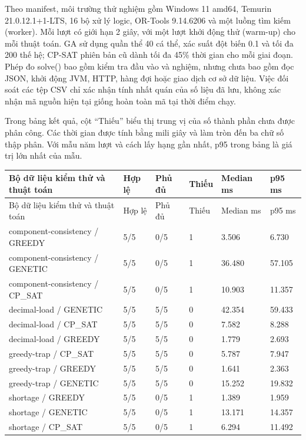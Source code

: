 \documentclass[12pt,a4paper]{report}
\begin{document}
Theo manifest, môi trường thử nghiệm gồm Windows 11 amd64, Temurin 21.0.12.1+1-LTS, 16 bộ xử lý logic, OR-Tools 9.14.6206 và một luồng tìm kiếm (worker). Mỗi lượt có giới hạn 2 giây, với một lượt khởi động thử (warm-up) cho mỗi thuật toán. GA sử dụng quần thể 40 cá thể, xác suất đột biến 0.1 và tối đa 200 thế hệ; CP-SAT phiên bản cũ dành tối đa 45\% thời gian cho mỗi giai đoạn. Phép đo solve() bao gồm kiểm tra đầu vào và nghiệm, nhưng chưa bao gồm đọc JSON, khởi động JVM, HTTP, hàng đợi hoặc giao dịch cơ sở dữ liệu. Việc đối soát các tệp CSV chỉ xác nhận tính nhất quán của số liệu đã lưu, không xác nhận mã nguồn hiện tại giống hoàn toàn mã tại thời điểm chạy.

Trong bảng kết quả, cột ``Thiếu'' biểu thị trung vị của số thành phần chưa được phân công. Các thời gian được tính bằng mili giây và làm tròn đến ba chữ số thập phân. Với mẫu năm lượt và cách lấy hạng gần nhất, p95 trong bảng là giá trị lớn nhất của mẫu.
\begin{longtable}{|p{3.2cm}|p{1.7cm}|p{1.4cm}|p{1.4cm}|p{1.7cm}|p{1.7cm}|}\hline
Bộ dữ liệu kiểm thử và thuật toán & Hợp lệ & Phủ đủ & Thiếu & Median ms & p95 ms \\\hline\endfirsthead
\hline Bộ dữ liệu kiểm thử và thuật toán & Hợp lệ & Phủ đủ & Thiếu & Median ms & p95 ms \\\hline\endhead
component-consistency / GREEDY & 5/5 & 0/5 & 1 & 3.506 & 6.730 \\\hline
component-consistency / GENETIC & 5/5 & 0/5 & 1 & 36.480 & 57.105 \\\hline
component-consistency / CP\_SAT & 5/5 & 0/5 & 1 & 10.903 & 11.357 \\\hline
decimal-load / GENETIC & 5/5 & 5/5 & 0 & 42.354 & 59.433 \\\hline
decimal-load / CP\_SAT & 5/5 & 5/5 & 0 & 7.582 & 8.288 \\\hline
decimal-load / GREEDY & 5/5 & 5/5 & 0 & 1.779 & 2.693 \\\hline
greedy-trap / CP\_SAT & 5/5 & 5/5 & 0 & 5.787 & 7.947 \\\hline
greedy-trap / GREEDY & 5/5 & 5/5 & 0 & 1.641 & 2.363 \\\hline
greedy-trap / GENETIC & 5/5 & 5/5 & 0 & 15.252 & 19.832 \\\hline
shortage / GREEDY & 5/5 & 0/5 & 1 & 1.389 & 1.959 \\\hline
shortage / GENETIC & 5/5 & 0/5 & 1 & 13.171 & 14.357 \\\hline
shortage / CP\_SAT & 5/5 & 0/5 & 1 & 6.294 & 11.492 \\\hline
\end{longtable}
\end{document}
